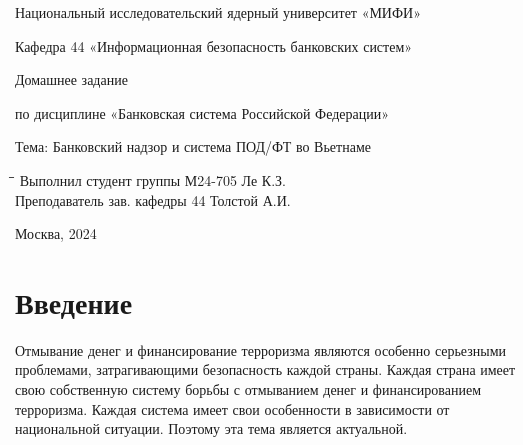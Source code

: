 \documentclass{article}
\begin{document}
\begin{titlepage}
\begin{center}
Национальный исследовательский ядерный университет «МИФИ»

Кафедра 44 «Информационная безопасность банковских систем»
\end{center}

\vspace*{4\baselineskip}

\begin{center}
  Домашнее задание

  по дисциплине «Банковская система Российской Федерации»
\end{center}

\vspace*{4\baselineskip}

\noindent Тема: Банковский надзор и система ПОД/ФТ во Вьетнаме


\vspace*{4\baselineskip}

\begin{tabbing}
  \hspace{120pt}\=\hspace{240pt}\=\hspace{120pt}\=\kill
  Выполнил \> студент группы М24-705 \> Ле К.З. \\ 
  Преподаватель \> зав. кафедры 44 \> Толстой А.И.  \\
\end{tabbing}

\vspace*{4\baselineskip}
\begin{center}
  Москва, 2024
\end{center}
\end{titlepage}

\setcounter{page}{2}

\newpage

\tableofcontents

\newpage

\section*{Введение}

Отмывание денег и финансирование терроризма являются особенно серьезными проблемами, затрагивающими безопасность каждой страны. Каждая страна имеет свою собственную систему борьбы с отмыванием денег и финансированием терроризма. Каждая система имеет свои особенности в зависимости от национальной ситуации. Поэтому эта тема является актуальной.
\end{document}
